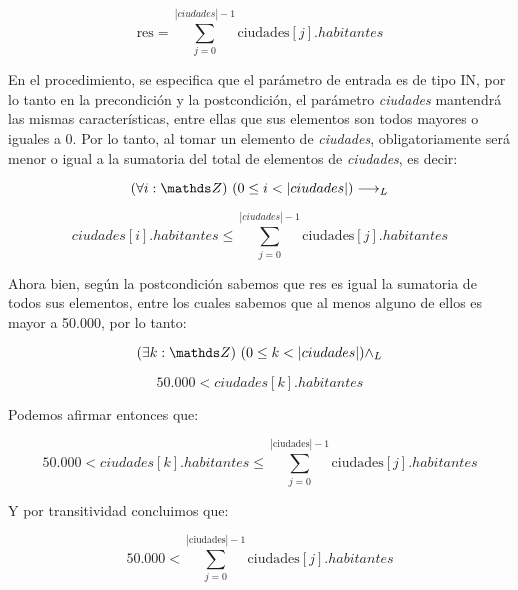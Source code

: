\documentclass[10pt,a4paper]{article}
\begin{document}
\[
\text{res} = \sum_{j=0}^{|ciudades|-1} \text{ciudades}[j].habitantes 
\]

En el procedimiento, se especifica que el parámetro de entrada es de tipo IN, por lo tanto en la precondición y la postcondición, el parámetro \textit{ciudades} mantendrá las mismas características, entre ellas que sus elementos son todos mayores o iguales a 0. Por lo tanto, al tomar un elemento de \textit{ciudades}, obligatoriamente será menor o igual a la sumatoria del total de elementos de \textit{ciudades}, es decir:

\[
	\paraTodo[unalinea]{i}{\ent}{0 \leq i < |ciudades|} \implicaLuego
\]

\[
\textit{ciudades}[i].habitantes \leq \sum_{j=0}^{|ciudades|-1} \text{ciudades}[j].habitantes 
\]

Ahora bien, según la postcondición sabemos que res es igual la sumatoria de todos sus elementos, entre los cuales sabemos que al menos alguno de ellos es mayor a 50.000, por lo tanto:

\[
\existe[unalinea]{k}{\ent}{0 \leq k < |ciudades|} \yLuego
\]

\[
50.000 < \textit{ciudades}[k].habitantes  
\]

Podemos afirmar entonces que:

\[
50.000 < \textit{ciudades}[k].habitantes \leq \sum_{j=0}^{|\text{ciudades}|-1} \text{ciudades}[j].habitantes 
\]

Y por transitividad concluimos que:

\[
50.000 < \sum_{j=0}^{|\text{ciudades}|-1} \text{ciudades}[j].habitantes
\]
\end{document}
